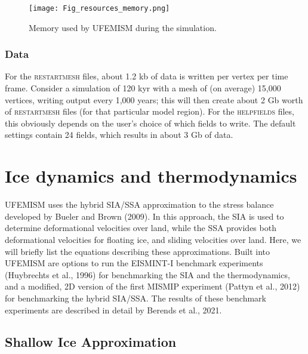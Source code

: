 \documentclass{article}
\begin{document}
\begin{figure}[h!] \label{fig:resources_memory}
  \texttt{[image: Fig\_resources\_memory.png]}
  \caption{Memory used by UFEMISM during the simulation.}
\end{figure}

\subsubsection{Data}

For the \textsc{restart\textunderscore mesh} files, about 1.2 kb of data is written per vertex per time frame. Consider a simulation of 120 kyr with a mesh of (on average) 15,000 vertices, writing output every 1,000 years; this will then create about 2 Gb worth of \textsc{restart\textunderscore mesh} files (for that particular model region). For the \textsc{help\textunderscore fields} files, this obviously depends on the user's choice of which fields to write. The default settings contain 24 fields, which results in about 3 Gb of data.

\newpage
\section{Ice dynamics and thermodynamics}

UFEMISM uses the hybrid SIA/SSA approximation to the stress balance developed by Bueler and Brown (2009). In this approach, the SIA is used to determine deformational velocities over land, while the SSA provides both deformational velocities for floating ice, and sliding velocities over land. Here, we will briefly list the equations describing these approximations. Built into UFEMISM are options to run the EISMINT-I benchmark experiments (Huybrechts et al., 1996) for benchmarking the SIA and the thermodynamics, and a modified, 2D version of the first MISMIP experiment (Pattyn et al., 2012) for benchmarking the hybrid SIA/SSA. The results of these benchmark experiments are described in detail by Berends et al., 2021.

\subsection{Shallow Ice Approximation}
\end{document}
